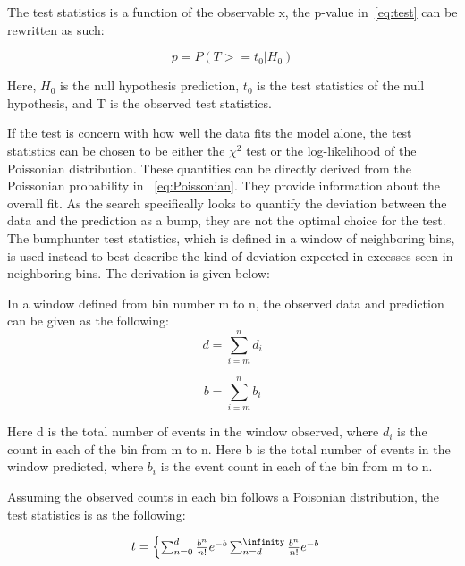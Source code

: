 The test statistics is a function of the observable x, the p-value in~\ref{eq:test} can be rewritten as such:
    
\begin{equation}
    p = P(T>=t_{0}| H_{0})
\label{eq:p-valuetestStats}
\end{equation}

Here, $H_0$ is the null hypothesis prediction, $t_0$ is the test statistics of the null hypothesis, and T is the observed test statistics.


If the test is concern with how well the data fits the model alone, the test statistics can be chosen to be either the $\chi^{2}$ test or the log-likelihood of the Poissonian distribution. These quantities can be directly derived from the Poissonian probability in ~\ref{eq:Poissonian}. They provide information about the overall fit. As the search specifically looks to quantify the deviation between the data and the prediction as a bump, they are not the optimal choice for the test. 
The bumphunter test statistics, which is defined in a window of neighboring bins, is used instead to best describe the kind of deviation expected in excesses seen in neighboring bins. The derivation is given below: 

In a window defined from bin number m to n, the observed data and prediction can be given as the following: 
    \begin{equation}
         d= \sum_{i=m}^{n} d_i 
    \end{equation}

    
    \begin{equation}
         b= \sum_{i=m}^{n} b_i
    \end{equation}

    Here d is the total number of events in the window observed, where $d_i$ is the count in each of the bin from m to n. 
    Here b is the total number of events in the window predicted, where $b_i$ is the event count in each of the bin from m to n.
    
    Assuming the observed counts in each bin follows a Poisonian distribution, the test statistics is as the following:

	\begin{equation}
    t=
	\begin{cases} \sum_{n=0}^{d} \frac{b^{n}}{n!} e^{-b}%
    \sum_{n=d}^{\infinity} \frac{b^n}{n!}e^{-b}%
    \end{cases}
    \end{equation}

